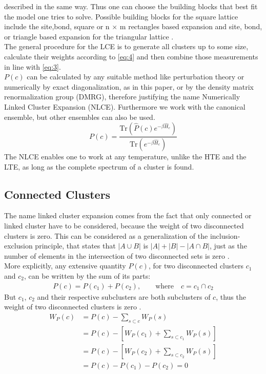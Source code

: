 \documentclass{article}
\begin{document}
described in the same way. Thus one can choose the
building blocks that best fit the model one tries to solve. Possible building blocks for the square
lattice include the site,bond, square or n
$\times$ m rectangles based expansion and site, bond, or triangle
based expansion for the triangular lattice \cite{Rigol,Kallin}.\\
The general procedure for the LCE is to generate all clusters up to
some size, calculate their weights according to \eqref{eq:4} and then combine those
measurements in line with \eqref{eq:3}.\\
$P(c)$ can be calculated by any suitable method like perturbation theory
or numerically by exact diagonalization, as in this paper, or by the
density matrix renormalization group (DMRG), therefore justifying the name Numerically Linked Cluster
Expansion (NLCE). Furthermore we work with the canonical ensemble, but
other ensembles can also be used.\\
\begin{equation}
\label{eq:6}
P(c) = \frac{ \text{Tr} \left(\hat P(c) e^{-\beta \hat H_c} \right)}{ \text{Tr}
  \left(e^{-\beta \hat H_c} \right)}
\end{equation}
The NLCE enables one to work at any temperature, unlike the HTE and
the LTE, as long as the complete spectrum of a cluster is found.
\subsection{Connected Clusters}
The name linked cluster expansion comes from the fact that only
connected or linked cluster have to be considered, because the weight of two disconnected clusters is zero. This can be considered as a generalization of the
inclusion-exclusion principle, that states that $|A \cup B|$ is $|A|
+ |B| - |A \cap B|$, just as the number of elements in
the intersection of two disconnected sets is zero \cite{Melko}.\\
More explicitly, any extensive quantity $P(c)$, for two disconnected
clusters $c_1$ and $c_2$, can be written by the sum of its parts:
\begin{align}
\label{eq:7}
P(c) = P(c_1) + P(c_2), \qquad \text{where} \quad c = c_1 \cap c_2
\end{align}
But $c_1$, $c_2$ and their respective subclusters are both
subclusters of $c$, thus the weight of two disconnected clusters is zero
\cite{Rigol}.
\begin{align}
\label{eq:8}
W_P(c) &= P(c) - \sum\limits_{s \subset c} W_P(s)\\
&= P(c) - \left[ W_P(c_1) + \sum\limits_{s \subset c_1} W_P(s)
  \right]\\
&= P(c) - \left[ W_P(c_2) + \sum\limits_{s \subset c_2} W_P(s)
  \right]\\
&= P(c) - P(c_1) -P(c_2) = 0
\end{align}
\end{document}
